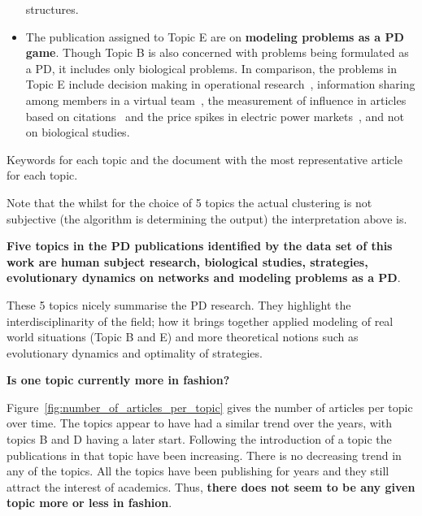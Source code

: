 \documentclass{article}
\theoremstyle{definition}
\begin{document}
\begin{itemize}
    structures.
    \item The publication assigned to Topic E are on \textbf{modeling problems
    as a PD game}. Though Topic B is also concerned with problems being formulated
    as a PD, it includes only biological problems. In comparison, the problems
    in Topic E include decision making in
    operational research~\cite{ormerod2010or}, information sharing among members
    in a virtual team~\cite{feng2008trilateral}, the measurement of influence
    in articles based on citations~\cite{hutchins2016relative} and the price
    spikes in electric power markets~\cite{Guan2002}, and not on biological studies.
\end{itemize}

\begin{table}[!hbtp]
    \begin{center}
    \resizebox{\textwidth}{!}{
    }
    \end{center}
    \caption{Keywords for each topic and the document with the most representative article for each topic.}
    \label{table:topics_and_articles}
\end{table}

Note that the whilst for the choice of 5 topics the actual clustering is not
subjective (the algorithm is determining the output) the interpretation above is.

\textbf{Five topics in the PD publications identified by the data set of this
work are human subject research, biological studies, strategies, evolutionary
dynamics on networks and modeling problems as a PD}.

These 5 topics nicely
summarise the PD research. They highlight the interdisciplinarity of the field;
how it brings together applied modeling of real world situations (Topic B and E)
and more theoretical notions such as evolutionary dynamics and optimality of
strategies.

\textbf{Is one topic currently more in fashion?}

Figure~\ref{fig:number_of_articles_per_topic} gives the number of articles
per topic over time. The topics appear to have had a similar trend over the years,
with topics B and D having a later start. Following the introduction of a topic
the publications in that topic have been increasing. There is no decreasing
trend in any of the topics. All the topics have been publishing for years and
they still attract the interest of academics. Thus, \textbf{there does not
seem to be any given topic more or less in fashion}.
\end{document}
